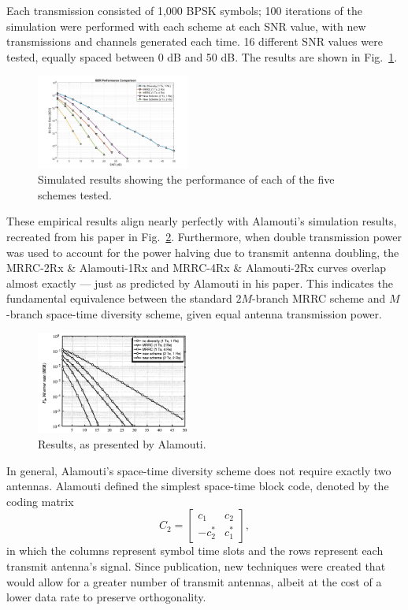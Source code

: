 \documentclass[journal]{IEEEtran}
\begin{document}
Each transmission consisted of 1,000 BPSK symbols; 100 iterations of the simulation were performed with each scheme at each SNR value, with new transmissions and channels generated each time. 16 different SNR values were tested, equally spaced between 0 dB and 50 dB. The results are shown in Fig.~\ref{fig:BER_mine}.
\begin{figure}
    \centering
    \includegraphics[width = 0.45\textwidth]{BER}
    \caption{Simulated results showing the performance of each of the five schemes tested.}
    \label{fig:BER_mine}
\end{figure}

These empirical results align nearly perfectly with Alamouti's simulation results, recreated from his paper in Fig.~\ref{fig:BER_alamouti}. Furthermore, when double transmission power was used to account for the power halving due to transmit antenna doubling, the MRRC-2Rx \& Alamouti-1Rx and MRRC-4Rx \& Alamouti-2Rx curves overlap almost exactly --- just as predicted by Alamouti in his paper. This indicates the fundamental equivalence between the standard $2M$-branch MRRC scheme and $M$-branch space-time diversity scheme, given equal antenna transmission power.
\begin{figure}
    \centering
    \includegraphics[width = 0.45\textwidth]{BER_alamouti}
    \caption{Results, as presented by Alamouti.}
    \label{fig:BER_alamouti}
\end{figure}

In general, Alamouti's space-time diversity scheme does not require exactly two antennas. Alamouti defined the simplest space-time block code, denoted by the coding matrix
\begin{equation}
C_2 = \begin{bmatrix}
c_1 & c_2 \\
-c_2^* & c_1^*
\end{bmatrix},
\end{equation}
in which the columns represent symbol time slots and the rows represent each transmit antenna's signal. Since publication, new techniques were created that would allow for a greater number of transmit antennas, albeit at the cost of a lower data rate to preserve orthogonality.


	
\end{document}
